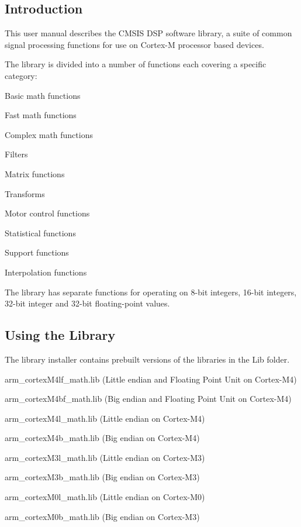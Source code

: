 \subsection*{Introduction }

This user manual describes the C\+M\+S\+IS D\+SP software library, a suite of common signal processing functions for use on Cortex-\/M processor based devices.

The library is divided into a number of functions each covering a specific category\+:
\begin{DoxyItemize}
\item Basic math functions
\item Fast math functions
\item Complex math functions
\item Filters
\item Matrix functions
\item Transforms
\item Motor control functions
\item Statistical functions
\item Support functions
\item Interpolation functions
\end{DoxyItemize}

The library has separate functions for operating on 8-\/bit integers, 16-\/bit integers, 32-\/bit integer and 32-\/bit floating-\/point values.

\subsection*{Using the Library }

The library installer contains prebuilt versions of the libraries in the {\ttfamily Lib} folder.
\begin{DoxyItemize}
\item arm\+\_\+cortex\+M4lf\+\_\+math.\+lib (Little endian and Floating Point Unit on Cortex-\/\+M4)
\item arm\+\_\+cortex\+M4bf\+\_\+math.\+lib (Big endian and Floating Point Unit on Cortex-\/\+M4)
\item arm\+\_\+cortex\+M4l\+\_\+math.\+lib (Little endian on Cortex-\/\+M4)
\item arm\+\_\+cortex\+M4b\+\_\+math.\+lib (Big endian on Cortex-\/\+M4)
\item arm\+\_\+cortex\+M3l\+\_\+math.\+lib (Little endian on Cortex-\/\+M3)
\item arm\+\_\+cortex\+M3b\+\_\+math.\+lib (Big endian on Cortex-\/\+M3)
\item arm\+\_\+cortex\+M0l\+\_\+math.\+lib (Little endian on Cortex-\/\+M0)
\item arm\+\_\+cortex\+M0b\+\_\+math.\+lib (Big endian on Cortex-\/\+M3)
\end{DoxyItemize}

